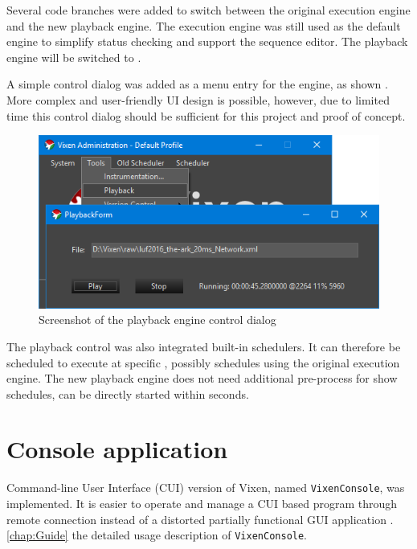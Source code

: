 Several code branches were added to switch between the original execution engine and the new playback engine. The execution engine was still used as the default engine to simplify status checking and support the sequence editor. The playback engine will be switched to .

A simple control dialog was added as a menu entry for the  engine, as shown  . More complex and user-friendly UI design is possible, however, due to limited time  this control dialog should be sufficient for this project and proof of concept.

\begin{figure}[t]
  \centering
  \includegraphics[width=0.8\columnwidth]{Figs/vixen_playback.png}
  \caption{\footnotesize Screenshot of the playback engine control dialog}
  \label{fig:vixen_playback}
\end{figure}

The playback control was also integrated  built-in schedulers. It can therefore be scheduled to execute at specific , possibly  schedules using the original execution engine. The new playback engine does not need additional pre-process for show schedules,  can be directly started within seconds.

\section{Console application}

 Command-line User Interface (CUI) version of Vixen, named \texttt{VixenConsole}, was implemented. It is easier to operate and manage a CUI based program through remote connection  instead of a distorted partially functional GUI application . \cref{chap:Guide}  the detailed usage description of \texttt{VixenConsole}.

